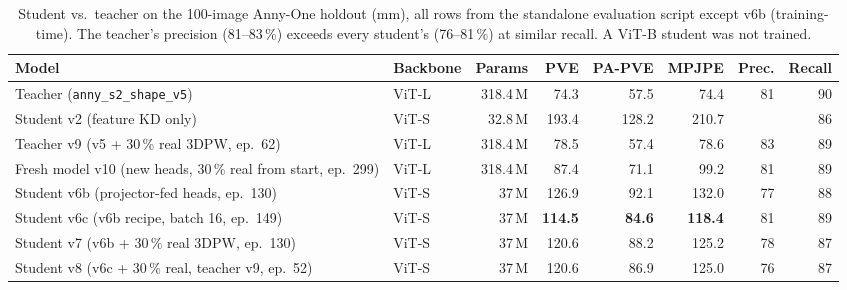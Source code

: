 
\begin{table}[h]
\centering\small
\begin{tabular}{llrrrrrr}
\toprule
Model & Backbone & Params & PVE & PA-PVE & MPJPE & Prec. & Recall \\
\midrule
Teacher (\texttt{anny\_s2\_shape\_v5}) & ViT-L & 318.4\,M & 74.3 & 57.5 & 74.4 & 81 & 90 \\
Student v2 (feature KD only) & ViT-S & 32.8\,M & 193.4 & 128.2 & 210.7 & & 86 \\
Teacher v9 (v5 + 30\,\% real 3DPW, ep.\ 62) & ViT-L & 318.4\,M & 78.5 & 57.4 & 78.6 & 83 & 89 \\
Fresh model v10 (new heads, 30\,\% real from start, ep.\ 299) & ViT-L & 318.4\,M & 87.4 & 71.1 & 99.2 & 81 & 89 \\
Student v6b (projector-fed heads, ep.\ 130) & ViT-S & 37\,M & 126.9 & 92.1 & 132.0 & 77 & 88 \\
Student v6c (v6b recipe, batch 16, ep.\ 149) & ViT-S & 37\,M & \textbf{114.5} & \textbf{84.6} & \textbf{118.4} & 81 & 89 \\
Student v7 (v6b + 30\,\% real 3DPW, ep.\ 130) & ViT-S & 37\,M & 120.6 & 88.2 & 125.2 & 78 & 87 \\
Student v8 (v6c + 30\,\% real, teacher v9, ep.\ 52) & ViT-S & 37\,M & 120.6 & 86.9 & 125.0 & 76 & 87 \\
\bottomrule
\end{tabular}
\caption{Student vs.\ teacher on the 100-image Anny-One holdout (mm), all
rows from the standalone evaluation script except v6b (training-time). The
teacher's precision (81--83\,\%) exceeds every student's (76--81\,\%) at
similar recall. A ViT-B student was not trained.}
\label{tab:kd_eval}
\end{table}
